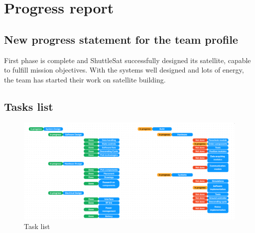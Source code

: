 \documentclass[11pt]{article}
\begin{document}


\tableofcontents
\pagestyle{plain}

\newpage





\section{Progress report}

\subsection{New progress statement for the team profile}
\hspace{0.5cm} First phase is complete and ShuttleSat successfully designed its satellite, capable to fulfill mission objectives. With the systems well designed and lots of energy, the team has started their work on satellite building.

\subsection{Tasks list}
\begin{figure}[H]
\includegraphics[width=15cm]{Tasks list.png}
\centering
\caption{Task list}
\end{figure}
\end{document}
